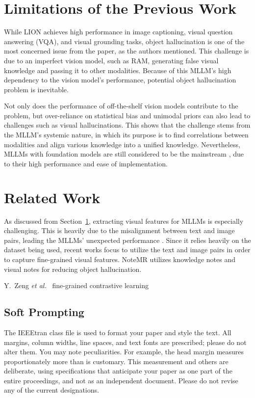 \documentclass[conference]{IEEEtran}
\begin{document}
\section{Limitations of the Previous Work}\label{limits}

While LION achieves high performance in image captioning, visual question answering (VQA), and visual grounding tasks, object hallucination is one of the most concerned issue from the paper, as the authors mentioned.
This challenge is due to an imperfect vision model, such as RAM, generating false visual knowledge and passing it to other modalities.
Because of this MLLM's high dependency to the vision model's performance, potential object hallucination problem is inevitable.

Not only does the performance of off-the-shelf vision models contribute to the problem, but over-reliance on statistical bias \cite{hal_bias} and unimodal priors \cite{unimodal_bias, unimodal_2} can also lead to challenges such as visual hallucinations.
This shows that the challenge stems from the MLLM's systemic nature, in which its purpose is to find correlations between modalities and align various knowledge into a unified knowledge.
Nevertheless, MLLMs with foundation models are still considered to be the mainstream \cite{foundationMLLM}, due to their high performance and ease of implementation.


\section{Related Work}
As discussed from Section~\ref{limits}, extracting visual features for MLLMs is especially challenging.
This is heavily due to the misalignment between text and image pairs, leading the MLLMs' unexpected performance \cite{cho2022fine, jain2024vcoder}.
Since it relies heavily on the dataset being used, recent works focus to utilize the text and image pairs in order to capture fine-grained visual features.
NoteMR \cite{fang2025guided} utilizes knowledge notes and visual notes for reducing object hallucination.

Y.~Zeng \textit{et al.}~\cite{contrastive} fine-grained contrastive learning

\subsection{Soft Prompting}

The IEEEtran class file is used to format your paper and style the text. All margins, 
column widths, line spaces, and text fonts are prescribed; please do not 
alter them. You may note peculiarities. For example, the head margin
measures proportionately more than is customary. This measurement 
and others are deliberate, using specifications that anticipate your paper 
as one part of the entire proceedings, and not as an independent document. 
Please do not revise any of the current designations.
\end{document}
